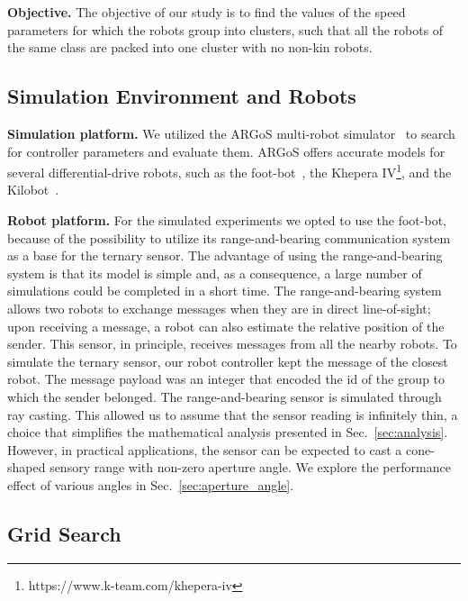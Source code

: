 \documentclass[conference]{IEEEtran}
\newcommand{\myparagraph}[1]{\textbf{#1.}}
\begin{document}
\myparagraph{Objective}
The objective of our study is to find the values of the speed parameters for
which the robots group into clusters, such that all the robots of the same class
are packed into one cluster with no non-kin robots.

\subsection{Simulation Environment and Robots}

\myparagraph{Simulation platform} We utilized the ARGoS multi-robot
simulator~\cite{pinciroli_argos:_2012} to search for controller parameters and
evaluate them. ARGoS offers accurate models for several differential-drive
robots, such as the foot-bot~\cite{Bonani2010}, the Khepera
IV\footnote{https://www.k-team.com/khepera-iv}, and the
Kilobot~\cite{Rubenstein2012}.

\myparagraph{Robot platform}
For the simulated experiments we opted to use the foot-bot, because of the
possibility to utilize its range-and-bearing communication system as a base for
the ternary sensor. The advantage of using the range-and-bearing system is that
its model is simple and, as a consequence, a large number of simulations could
be completed in a short time. The range-and-bearing system allows two robots to
exchange messages when they are in direct line-of-sight; upon receiving a
message, a robot can also estimate the relative position of the sender. This
sensor, in principle, receives messages from all the nearby robots. To simulate
the ternary sensor, our robot controller kept the message of the closest
robot. The message payload was an integer that encoded the id of the group to
which the sender belonged. The range-and-bearing sensor is simulated through ray
casting. This allowed us to assume that the sensor reading is infinitely thin, a
choice that simplifies the mathematical analysis presented in
Sec.~\ref{sec:analysis}. However, in practical applications, the sensor can be
expected to cast a cone-shaped sensory range with non-zero aperture angle. We
explore the performance effect of various angles in
Sec.~\ref{sec:aperture_angle}.

\subsection{Grid Search}
\label{sec:gridsearch}
  
\end{document}
